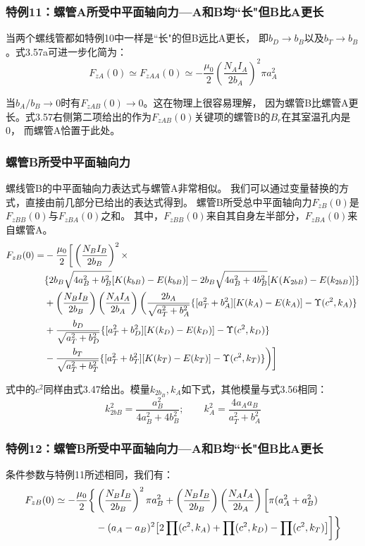 \subsubsection{特例11：螺管A所受中平面轴向力---A和B均``长"但B比A更长}
当两个螺线管都如特例10中一样是``长"的但B远比A更长，
即$b_D\rightarrow b_B$以及$b_T\rightarrow b_B$。式3.57a可进一步化简为：
\begin{equation*}
F_{zA}(0)\simeq F_{zAA}(0)\simeq -\frac{\mu_0}{2}\left(\frac{N_AI_A}{2b_A}\right)^2\pi a_A^2 \tag{3.57'}
\end{equation*}

当$b_A/b_B\rightarrow 0$时有$F_{zAB}(0)\rightarrow 0$。这在物理上很容易理解，
因为螺管B比螺管A更长。式3.57右侧第二项给出的作为$F_{zAB}(0)$关键项的螺管B的$B_r$在其室温孔内是0，
而螺管A恰置于此处。

\subsubsection{螺管B所受中平面轴向力}
螺线管B的中平面轴向力表达式与螺管A非常相似。
我们可以通过变量替换的方式，直接由前几部分已给出的表达式得到。
螺管B所受总中平面轴向力$F_{zB}(0)$是$F_{zBB}(0)$与$F_{zBA}(0)$之和。
其中，$F_{zBB}(0)$来自其自身左半部分，$F_{zBA}(0)$来自螺管A。
\begin{align}
F_{zB}(0)=&-\frac{\mu_0}{2}\bigg[\left(\frac{N_BI_B}{2b_B}\right)^2\times\\\notag
&\{2b_B\sqrt{4a_B^2+b_B^2}[K(k_{bB})-E(k_{bB})]-2b_B\sqrt{4a_B^2+4b_B^2}[K(K_{2bB})-E(k_{2bB})]\}\\\notag
&+\left(\frac{N_BI_B}{2b_B}\right)\left(\frac{N_AI_A}{2b_A}\right)\bigg(\frac{2b_A}{\sqrt{a_T^2+b_A^2}}\{[a_T^2+b_A^2][K(k_A)-E(k_A)]-\Upsilon(c^2,k_A)\}\\\notag
&+\frac{b_D}{\sqrt{a_T^2+b_D^2}}\{[a_T^2+b_D^2][K(k_D)-E(k_D)]-\Upsilon(c^2,k_D)\}\\\notag
&-\frac{b_T}{\sqrt{a_T^2+b_T^2}}\{[a_T^2+b_T^2][K(k_T)-E(k_T)]-\Upsilon(c^2,k_T)\}\bigg)\bigg]
\end{align}

式中的$c^2$同样由式3.47给出。模量$k_{2b_B},k_A$如下式，其他模量与式3.56相同：
\begin{equation*}
k_{2bB}^2=\frac{a_B^2}{4a_B^2+4b_B^2};\quad \quad k_A^2=\frac{4a_Aa_B}{a_T^2+b_A^2}
\end{equation*}

\subsubsection{特例12：螺管B所受中平面轴向力---A和B均``长"但B比A更长}
条件参数与特例11所述相同，我们有：
\begin{align}
F_{zB}(0)\simeq -\frac{\mu_0}{2}\bigg\{&\left(\frac{N_BI_B}{2b_B}\right)^2\pi a_B^2+\left(\frac {N_BI_B}{2b_B}\right)\left(\frac{N_AI_A}{2b_A}\right)\bigg[\pi(a_A^2+a_B^2)\\\notag
&-(a_A-a_B)^2\big[2\prod(c^2,k_A)+\prod(c^2,k_D)-\prod(c^2,k_T)\big]\bigg]\bigg\}
\end{align}

